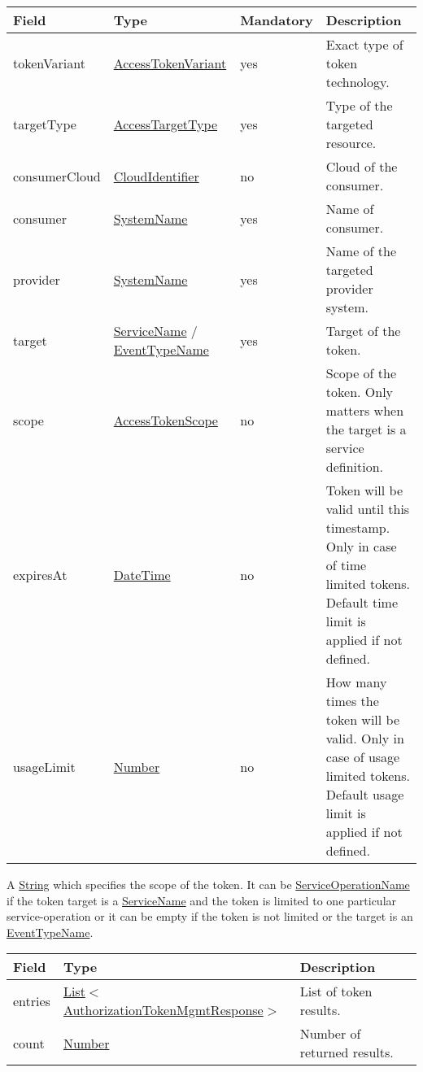 \documentclass[a4paper]{arrowhead}
\newcommand{\pref}[1]{{\textcolor{ArrowheadGrey}{\hyperref[sec:model:primitives:#1]{#1}}}}
\begin{document}
\begin{table}[ht!]
\begin{tabularx}{\textwidth}{| p{3cm} | p{4.5cm} | p{2cm} | X |} \hline
\rowcolor{gray!33} Field & Type & Mandatory & Description \\ \hline
tokenVariant & \pref{AccessTokenVariant} & yes & Exact type of token technology. \\ \hline
targetType & \pref{AccessTargetType} & yes & Type of the targeted resource. \\ \hline
consumerCloud & \pref{CloudIdentifier} & no & Cloud of the consumer. \\ \hline
consumer & \pref{SystemName} & yes & Name of consumer. \\ \hline
provider & \pref{SystemName} & yes & Name of the targeted provider system. \\ \hline
target & \pref{ServiceName} / \pref{EventTypeName} & yes & Target of the token. \\ \hline
scope & \hyperref[sec:model:AccessTokenScope]{AccessTokenScope} & no & Scope of the token. Only matters when the target is a service definition. \\ \hline
expiresAt & \pref{DateTime} & no & Token will be valid until this timestamp. Only in case of time limited tokens. Default time limit is applied if not defined. \\ \hline
usageLimit & \pref{Number} & no & How many times the token will be valid. Only in case of usage limited tokens. Default usage limit is applied if not defined. \\ \hline
\end{tabularx}
\end{table}


A \pref{String} which specifies the scope of the token. It can be \pref{ServiceOperationName} if the token target is a \pref{ServiceName} and the token is limited to one particular service-operation or it can be empty if the token is not limited or the target is an \pref{EventTypeName}. 


\begin{table}[ht!]
\begin{tabularx}{\textwidth}{| p{1.5cm} | p{8.2cm} | X |} \hline
\rowcolor{gray!33} Field & Type & Description \\ \hline
entries & \pref{List}$<$\hyperref[sec:model:AuthorizationTokenMgmtResponse]{AuthorizationTokenMgmtResponse}$>$ & List of token results. \\ \hline
count & \pref{Number} & Number of returned results. \\ \hline
\end{tabularx}
\end{table}
\end{document}
